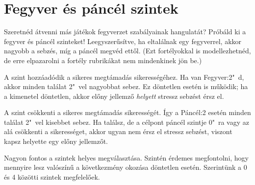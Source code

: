 \section{Fegyver és páncél szintek}

Szeretnéd átvenni más játékok fegyverzet szabályainak hangulatát? Próbáld ki a fegyver és páncél szinteket! Leegyszerűsítve, ha eltalálnak egy fegyverrel, akkor nagyobb a sebzés, míg a páncél megvéd ettől. (Ezt fortélyokkal is modellezhetnéd, de erre elpazarolni a fortély rubrikákat nem mindenkinek jön be.)

A  szint hozzáadódik a sikeres megtámadás sikerességéhez. Ha van Fegyver:2"~d, akkor minden találat 2"~vel nagyobbat sebez. Ez döntetlen esetén is működik; ha a kimenetel döntetlen, akkor előny jellemző \emph{helyett} stressz sebzést érsz el.

A  szint csökkenti a sikeres megtámadás sikerességét. Így a Páncél:2 esetén minden találat 2"~vel kisebbet sebez. Ha találsz, de a célpont páncél szintje 0"~ra vagy az alá csökkenti a sikerességet, akkor ugyan nem érsz el stressz sebzést, viszont kapsz helyette egy előny jellemzőt.

Nagyon fontos a szintek helyes megválasztása. Szintén érdemes megfontolni, hogy mennyire lesz valószínű a következmény okozása döntetlen esetén. Szerintünk a 0 és 4 közötti szintek megfelelőek.
